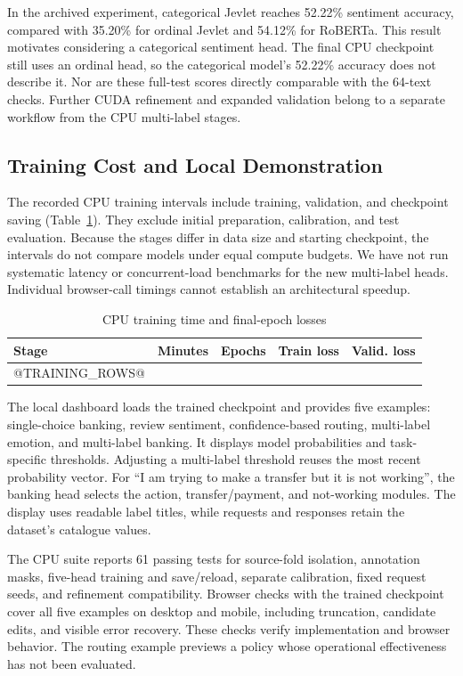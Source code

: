 \documentclass[conference]{IEEEtran}
\begin{document}
In the archived experiment, categorical Jevlet reaches 52.22\% sentiment accuracy, compared with 35.20\% for ordinal Jevlet and 54.12\% for RoBERTa. This result motivates considering a categorical sentiment head. The final CPU checkpoint still uses an ordinal head, so the categorical model's 52.22\% accuracy does not describe it. Nor are these full-test scores directly comparable with the 64-text checks. Further CUDA refinement and expanded validation belong to a separate workflow from the CPU multi-label stages.

\subsection{Training Cost and Local Demonstration}
The recorded CPU training intervals include training, validation, and checkpoint saving (Table~\ref{tab:training}). They exclude initial preparation, calibration, and test evaluation. Because the stages differ in data size and starting checkpoint, the intervals do not compare models under equal compute budgets. We have not run systematic latency or concurrent-load benchmarks for the new multi-label heads. Individual browser-call timings cannot establish an architectural speedup.

\begin{table}[!t]
\caption{CPU training time and final-epoch losses}
\label{tab:training}
\centering\footnotesize\setlength{\tabcolsep}{3.5pt}
\begin{tabular}{lrrrr}\toprule
Stage & Minutes & Epochs & Train loss & Valid. loss\\\midrule
@TRAINING_ROWS@
\bottomrule\end{tabular}
\end{table}

The local dashboard loads the trained checkpoint and provides five examples: single-choice banking, review sentiment, confidence-based routing, multi-label emotion, and multi-label banking. It displays model probabilities and task-specific thresholds. Adjusting a multi-label threshold reuses the most recent probability vector. For ``I am trying to make a transfer but it is not working'', the banking head selects the action, transfer/payment, and not-working modules. The display uses readable label titles, while requests and responses retain the dataset's catalogue values.

The CPU suite reports 61 passing tests for source-fold isolation, annotation masks, five-head training and save/reload, separate calibration, fixed request seeds, and refinement compatibility. Browser checks with the trained checkpoint cover all five examples on desktop and mobile, including truncation, candidate edits, and visible error recovery. These checks verify implementation and browser behavior. The routing example previews a policy whose operational effectiveness has not been evaluated.
\end{document}
